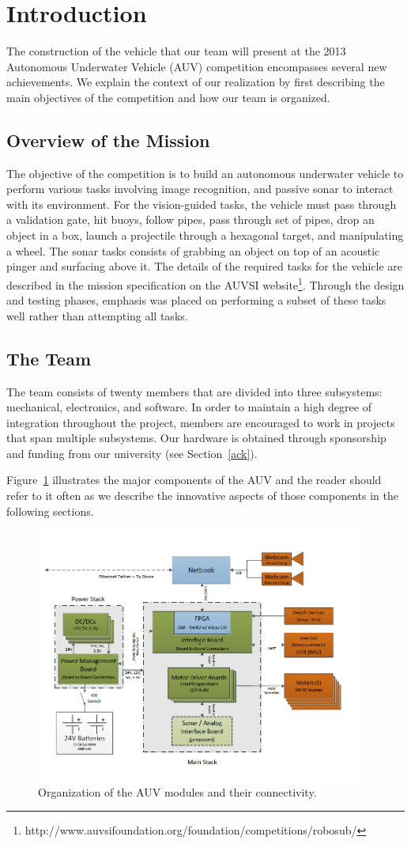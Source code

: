 \section{Introduction} 

The construction of the vehicle that our team will present at the
2013 Autonomous Underwater Vehicle (AUV) competition encompasses several new achievements. We explain the
context of our realization by first describing the main
objectives of the competition and how our team is organized.


\subsection{Overview of the Mission}

The objective of the competition is to build an autonomous underwater
vehicle to perform various tasks involving image recognition, and
passive sonar to
interact with its environment. For the vision-guided tasks, the vehicle must 
pass through a validation gate, hit buoys, follow pipes,
pass through set of pipes, drop an object
in a box, launch a projectile through a hexagonal target, and manipulating a wheel.
The sonar tasks consists of
grabbing an object on top of an acoustic pinger and surfacing above it.
The details of the required tasks for the vehicle are described in the
 mission specification on the AUVSI website\footnote[1]{http://www.auvsifoundation.org/foundation/competitions/robosub/}.
Through the design and testing phases, emphasis was placed on
performing a subset of these tasks well rather than attempting all tasks.

\subsection{The Team}
The team consists of twenty members that are divided into three subsystems: mechanical, electronics, and software. In order to maintain a high degree of integration throughout the project, members are encouraged to work in projects that span multiple subsystems. Our hardware is obtained through sponsorship and funding from our university (see Section~\ref{ack}). 

Figure~\ref{organi} illustrates the major components of the AUV
and the reader should refer to it often as we describe the innovative
aspects of those components in the following sections.


\begin{figure}
\begin{center}
 \includegraphics[height=3.3in]{fig/arch.png}
\caption{Organization of the AUV modules and their connectivity.}\label{organi}
\end{center}
\end{figure}


